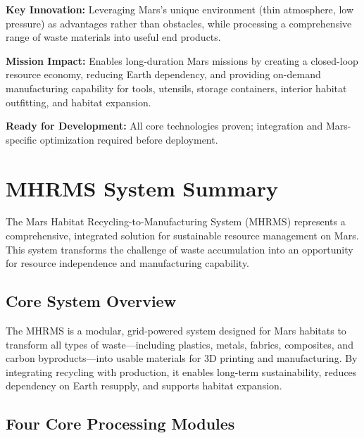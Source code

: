 \documentclass[12pt, a4paper]{article}
\begin{document}
\textbf{Key Innovation:} Leveraging Mars's unique environment (thin atmosphere, low pressure) as advantages rather than obstacles, while processing a comprehensive range of waste materials into useful end products.

\textbf{Mission Impact:} Enables long-duration Mars missions by creating a closed-loop resource economy, reducing Earth dependency, and providing on-demand manufacturing capability for tools, utensils, storage containers, interior habitat outfitting, and habitat expansion.

\textbf{Ready for Development:} All core technologies proven; integration and Mars-specific optimization required before deployment.

\section{MHRMS System Summary}

The Mars Habitat Recycling-to-Manufacturing System (MHRMS) represents a comprehensive, integrated solution for sustainable resource management on Mars. This system transforms the challenge of waste accumulation into an opportunity for resource independence and manufacturing capability.

\subsection{Core System Overview}

The MHRMS is a modular, grid-powered system designed for Mars habitats to transform all types of waste—including plastics, metals, fabrics, composites, and carbon byproducts—into usable materials for 3D printing and manufacturing. By integrating recycling with production, it enables long-term sustainability, reduces dependency on Earth resupply, and supports habitat expansion.

\subsection{Four Core Processing Modules}
\end{document}
